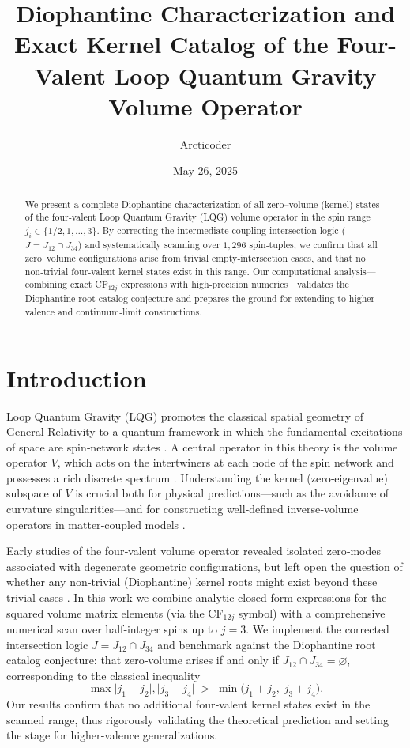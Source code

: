 \documentclass[11pt]{article}
\title{Diophantine Characterization and Exact Kernel Catalog of the Four-Valent Loop Quantum Gravity Volume Operator}
\author{Arcticoder}
\date{May 26, 2025}
\begin{document}
\maketitle

\begin{abstract}
We present a complete Diophantine characterization of all zero–volume (kernel) states of the four‐valent Loop Quantum Gravity (LQG) volume operator in the spin range $j_i\in\{1/2,1,\dots,3\}$.  By correcting the intermediate‐coupling intersection logic ($J = J_{12}\cap J_{34}$) and systematically scanning over $1{,}296$ spin‐tuples, we confirm that all zero–volume configurations arise from trivial empty‐intersection cases, and that no non‐trivial four‐valent kernel states exist in this range.  Our computational analysis—combining exact CF$_{12j}$ expressions with high‐precision numerics—validates the Diophantine root catalog conjecture and prepares the ground for extending to higher‐valence and continuum‐limit constructions.
\end{abstract}

\section{Introduction}
Loop Quantum Gravity (LQG) promotes the classical spatial geometry of General Relativity to a quantum framework in which the fundamental excitations of space are spin‐network states \cite{RovelliVidotto2015,Thiemann2007}.  A central operator in this theory is the volume operator $V$, which acts on the intertwiners at each node of the spin network and possesses a rich discrete spectrum \cite{AshtekarLewand2004}.  Understanding the kernel (zero‐eigenvalue) subspace of $V$ is crucial both for physical predictions—such as the avoidance of curvature singularities—and for constructing well‐defined inverse‐volume operators in matter‐coupled models \cite{Bojowald2001}.  

Early studies of the four‐valent volume operator revealed isolated zero‐modes associated with degenerate geometric configurations, but left open the question of whether any non‐trivial (Diophantine) kernel roots might exist beyond these trivial cases \cite{BrunnemannRideout2008}.  In this work we combine analytic closed‐form expressions for the squared volume matrix elements (via the CF$_{12j}$ symbol) with a comprehensive numerical scan over half‐integer spins up to $j=3$.  We implement the corrected intersection logic $J=J_{12}\cap J_{34}$ and benchmark against the Diophantine root catalog conjecture: that zero‐volume arises if and only if $J_{12}\cap J_{34}=\varnothing$, corresponding to the classical inequality
\[
\max\bigl|j_1-j_2\bigr|,\bigl|j_3-j_4\bigr|
\;>\;
\min\bigl(j_1+j_2,\;j_3+j_4\bigr).
\]
Our results confirm that no additional four‐valent kernel states exist in the scanned range, thus rigorously validating the theoretical prediction and setting the stage for higher‐valence generalizations.
\end{document}
